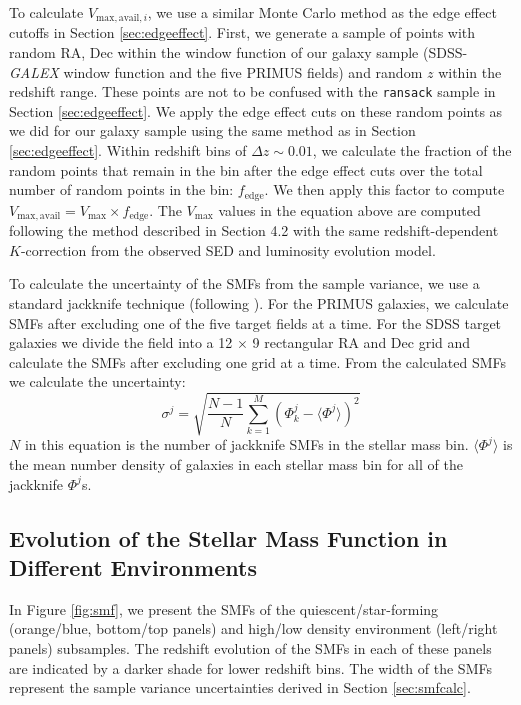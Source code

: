 \documentclass{emulateapj}
\begin{document}
To calculate $V_{\mathrm{max,avail},i}$, we use a similar Monte Carlo
method as the edge effect cutoffs in Section
\ref{sec:edgeeffect}. First, we generate a sample of points with
random RA, Dec within the window function of our galaxy sample
(SDSS-{\em GALEX} window function and the five PRIMUS fields) and
random $z$ within the redshift range. These points are not to be
confused with the \texttt{ransack} sample in Section
\ref{sec:edgeeffect}. We apply the edge effect cuts on these random
points as we did for our galaxy sample using the same method as in
Section \ref{sec:edgeeffect}. Within redshift bins of $\Delta z \sim
0.01$, we calculate the fraction of the random points that remain in
the bin after the edge effect cuts over the total number of random
points in the bin: $f_{\mathrm{edge}}$. We then apply this factor to
compute $V_{\mathrm{max,avail}} = V_{\mathrm{max}} \times f_{\mathrm{edge}}$. The
$V_{\mathrm{max}}$ values in the equation above are computed following the
method described in \cite{Moustakas:2013aa} Section 4.2 with the same
redshift-dependent $K$-correction from the observed SED and luminosity
evolution model.

To calculate the uncertainty of the SMFs from the sample variance, we use a standard jackknife technique (following \citealt{Moustakas:2013aa}). For the PRIMUS galaxies, we calculate SMFs after excluding one of the five target fields at a time. For the SDSS target galaxies we divide the field into a 12 $\times$ 9 rectangular RA and Dec grid and calculate the SMFs after excluding one grid at a time. From the calculated SMFs we calculate the uncertainty: 
\begin{equation}
\sigma^j = \sqrt{\frac{N-1}{N} \sum\limits_{k=1}^{M} (\Phi^j_k - \langle \Phi^j \rangle)^2}
\end{equation} 
$N$ in this equation is the number of jackknife SMFs in the stellar mass bin. $\langle \Phi^j \rangle$ is the mean number density of galaxies in each stellar mass bin for all of the jackknife $\Phi^j$s. 

\subsection{Evolution of the Stellar Mass Function in Different Environments} \label{sec:smfevol}
In Figure \ref{fig:smf}, we present the SMFs of the quiescent/star-forming (orange/blue, bottom/top panels) and high/low density environment (left/right panels) subsamples. The redshift evolution of the SMFs in each of these panels are indicated by a darker shade for lower redshift bins. The width of the SMFs represent the sample variance uncertainties derived in Section \ref{sec:smfcalc}.
\end{document}
